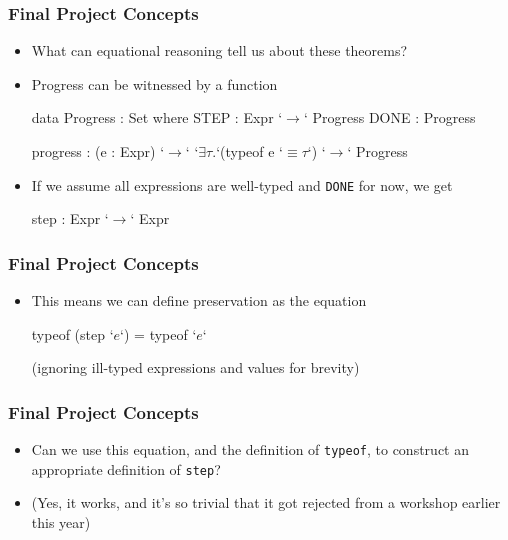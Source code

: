 \documentclass[usenames,dvipsnames]{beamer}
\begin{document}

\begin{frame}[fragile]
  \frametitle{Final Project Concepts}

  \begin{itemize}
    \item What can equational reasoning tell us about these theorems?

    \item Progress can be witnessed by a function
      \begin{code}
        data Progress : Set where
          STEP : Expr `$\rightarrow$`  Progress
          DONE : Progress

        progress : (e : Expr) `$\rightarrow$` `$\exists \tau .$`(typeof e `$\equiv \tau$`) `$\rightarrow$` Progress
      \end{code}

    \item If we assume all expressions are well-typed and \texttt{DONE} for
      now, we get
      \begin{code}
        step : Expr `$\rightarrow$` Expr
      \end{code}
  \end{itemize}
\end{frame}


\begin{frame}[fragile]
  \frametitle{Final Project Concepts}

  \begin{itemize}
    \item This means we can define preservation as the equation
      \begin{code}
        typeof (step `$e$`) = typeof `$e$`
      \end{code}
      (ignoring ill-typed expressions and values for brevity)
  \end{itemize}
\end{frame}


\begin{frame}[fragile]
  \frametitle{Final Project Concepts}

  \begin{itemize}
    \item Can we use this equation, and the definition of \texttt{typeof}, to
      construct an appropriate definition of \texttt{step}?

    \item \mbox{} (Yes, it works, and it's so trivial that it got
      rejected from a workshop earlier this year)
  \end{itemize}
\end{frame}
\end{document}
